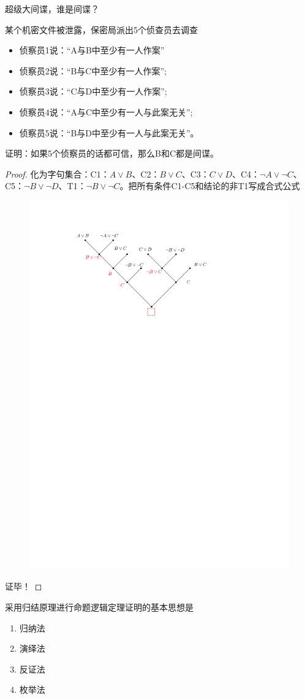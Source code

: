 \begin{example}
    超级大间谍，谁是间谍？

    某个机密文件被泄露，保密局派出5个侦查员去调查
    \begin{itemize}
        \item 侦察员1说：“A与B中至少有一人作案”
        \item 侦察员2说：“B与C中至少有一人作案”;
        \item 侦察员3说：“C与D中至少有一人作案”;
        \item 侦察员4说：“A与C中至少有一人与此案无关”;
        \item 侦察员5说：“B与D中至少有一人与此案无关”。
    \end{itemize}
    证明：如果5个侦察员的话都可信，那么B和C都是间谍。
    \begin{proof}
        化为字句集合：C1：$A\lor B$、C2：$B\lor C$、C3：$C\lor D$、C4：$\lnot A \lor \lnot C$、C5：$\lnot B \lor \lnot D$、T1：$\lnot B\lor \lnot C$。把\textcolor{main1}{所有条件C1-C5和结论的非T1}写成合式公式
        \begin{figure}[H]
            \centering
            \includegraphics[width = .5\textwidth]{image/谁是间谍.pdf}
        \end{figure} 
        证毕！
    \end{proof}
\end{example}
采用归结原理进行命题逻辑定理证明的基本思想是
\begin{enumerate}[A]
    \item 归纳法
    \item 演绎法
    \item \textcolor{main1}{反证法}
    \item 枚举法
\end{enumerate}

